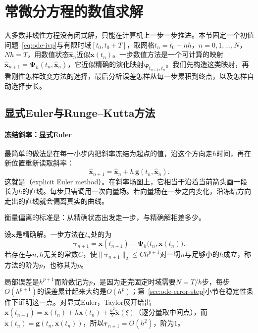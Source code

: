 
\section{常微分方程的数值求解}
\label{sec:ode-numerics}

大多数非线性方程没有闭式解，只能在计算机上一步一步推进。本节固定一个初值问题~\eqref{eq:ode-ivp}与有限时域$[t_0,t_0+T]$，取网格$t_n=t_0+nh$，$n=0,1,\ldots,N$，$Nh=T$，用数值状态$\widehat{\bm x}_n$近似$\bm x(t_n)$。一步数值方法是一个可计算的映射$\widehat{\bm x}_{n+1}=\bm\Psi_h(t_n,\widehat{\bm x}_n)$，它近似精确的演化映射$\bm\varphi_{t_{n+1},t_n}$。我们先构造这类映射，再看刚性怎样改变方法的选择，最后分析误差怎样从每一步累积到终点，以及怎样自动选择步长。

\subsection{显式Euler与Runge--Kutta方法}
\label{sec:ode-euler-rk}

\paragraph{冻结斜率：显式Euler}
最简单的做法是在每一小步内把斜率冻结为起点的值，沿这个方向走$h$时间，再在新位置重新读取斜率：
\begin{equation}
  \widehat{\bm x}_{n+1}=\widehat{\bm x}_n+h\,\bm g(t_n,\widehat{\bm x}_n).
  \label{eq:ode-forward-euler}
\end{equation}
这就是（explicit Euler method）。在斜率场图上，它相当于沿着当前箭头画一段长为$h$的直线。每步只需调用一次向量场。若向量场在一步之内变化，沿冻结方向走出的直线就会偏离真实的曲线。

衡量偏离的标准是：从精确状态出发走一步，与精确解相差多少。

\begin{definition}[局部截断误差与阶]
  \label{def:ode-local-truncation-error}
  设$\bm x$是精确解。一步方法在$t_n$处的为
  \[
    \bm\tau_{n+1}=\bm x(t_{n+1})-\bm\Psi_h\bigl(t_n,\bm x(t_n)\bigr).
  \]
  若存在与$n,h$无关的常数$C$，使$\|\bm\tau_{n+1}\|_2\leq Ch^{p+1}$对一切$n$与足够小的$h$成立，称方法的阶为$p$，也称其为$p$。
\end{definition}

局部误差是$h^{p+1}$而阶数记为$p$，是因为走完固定时域需要$N=T/h$步，每步$O(h^{p+1})$的误差累计起来大约是$O(h^p)$；第~\ref{sec:ode-error-step}小节在稳定性条件下证明这一点。对显式Euler，Taylor展开给出$\bm x(t_{n+1})=\bm x(t_n)+h\dot{\bm x}(t_n)+\tfrac{h^2}2\ddot{\bm x}(\xi)$（逐分量取中间点），而$\dot{\bm x}(t_n)=\bm g(t_n,\bm x(t_n))$，所以$\bm\tau_{n+1}=O(h^2)$，阶为$1$。

